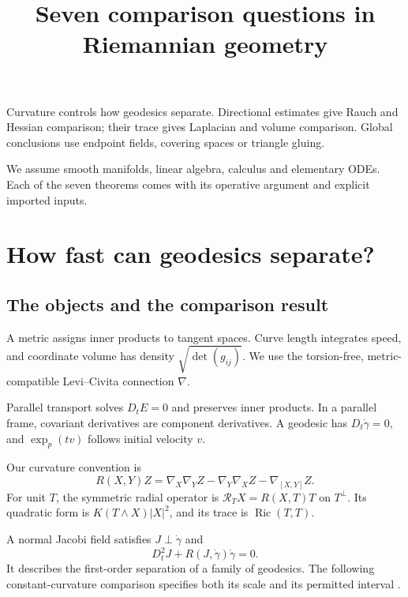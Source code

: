 \documentclass[12pt,reqno]{amsart}
\title{Seven comparison questions in Riemannian geometry}
\author{}
\date{}
\begin{document}
\raggedbottom
\maketitle

Curvature controls how geodesics separate. Directional estimates give Rauch and Hessian comparison; their trace gives Laplacian and volume comparison. Global conclusions use endpoint fields, covering spaces or triangle gluing.

We assume smooth manifolds, linear algebra, calculus and elementary ODEs. Each of the seven theorems comes with its operative argument and explicit imported inputs.

\section{How fast can geodesics separate?}
\label{sec:rauch}

\subsection*{The objects and the comparison result}
A metric assigns inner products to tangent spaces. Curve length integrates speed, and coordinate volume has density \(\sqrt{\det(g_{ij})}\).
We use the torsion-free, metric-compatible Levi--Civita connection \(\nabla\).

Parallel transport solves \(D_tE=0\) and preserves inner products. In a parallel frame, covariant derivatives are component derivatives. A geodesic has \(D_t\dot\gamma=0\), and \(\exp_p(tv)\) follows initial velocity \(v\).

Our curvature convention is
\[
R(X,Y)Z=\nabla_X\nabla_YZ-\nabla_Y\nabla_XZ-\nabla_{[X,Y]}Z.
\]
For unit \(T\), the symmetric radial operator is \(\mathcal R_T X=R(X,T)T\) on \(T^\perp\). Its quadratic form is \(K(T\wedge X)|X|^2\), and its trace is \(\operatorname{Ric}(T,T)\).

A normal Jacobi field satisfies \(J\perp\dot\gamma\) and
\[
D_t^2J+R(J,\dot\gamma)\dot\gamma=0.
\]
It describes the first-order separation of a family of geodesics. The following constant-curvature comparison specifies both its scale and its permitted interval \cite{S-Eschenburg-1994}.

\begin{samepage}
\begin{theorem}[Rauch]
\label{thm:rauch}

\end{theorem}
\end{samepage}
\end{document}
